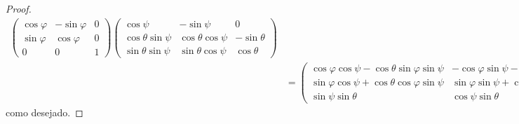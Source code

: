 \begin{proof}
\begin{align*}
\begin{pmatrix}
            \cos\varphi & -\sin\varphi & 0\\
            \sin\varphi & \cos\varphi & 0\\
            0 & 0 & 1
        \end{pmatrix}
        \begin{pmatrix}
            \cos\psi & -\sin\psi & 0\\
            \cos\theta \sin\psi & \cos\theta \cos\psi & -\sin\theta\\
            \sin\theta \sin \psi & \sin\theta \cos\psi& \cos\theta
        \end{pmatrix}\\
                  &= \begin{pmatrix}
            \cos\varphi \cos\psi - \cos\theta\sin\varphi\sin\psi & - \cos\varphi\sin\psi - \cos\theta \sin\varphi\cos\psi & \sin\varphi \sin\theta\\
            \sin\varphi \cos\psi + \cos\theta \cos\varphi \sin\psi & \sin\varphi\sin\psi + \cos\theta \cos\varphi \cos\psi & - \cos\varphi \sin\theta\\
            \sin\psi \sin\theta & \cos\psi\sin\theta & \cos\theta
        \end{pmatrix},
    \end{align*}
    como desejado.
\end{proof}
